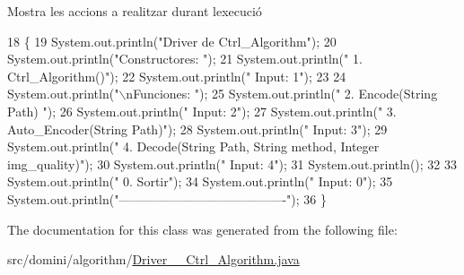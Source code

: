 Mostra les accions a realitzar durant l\textquotesingle{}execució 


\begin{DoxyCode}
18                                      \{
19         System.out.println(\textcolor{stringliteral}{"Driver de Ctrl\_Algorithm"});
20         System.out.println(\textcolor{stringliteral}{"Constructores: "});
21         System.out.println(\textcolor{stringliteral}{"     1. Ctrl\_Algorithm()"});
22         System.out.println(\textcolor{stringliteral}{"     Input: 1"});
23 
24         System.out.println(\textcolor{stringliteral}{"\(\backslash\)nFunciones: "});
25         System.out.println(\textcolor{stringliteral}{"     2. Encode(String Path) "});
26         System.out.println(\textcolor{stringliteral}{"     Input: 2"});
27         System.out.println(\textcolor{stringliteral}{"     3. Auto\_Encoder(String Path)"});
28         System.out.println(\textcolor{stringliteral}{"     Input: 3"});
29         System.out.println(\textcolor{stringliteral}{"     4. Decode(String Path, String method, Integer img\_quality)"});
30         System.out.println(\textcolor{stringliteral}{"     Input: 4"});
31         System.out.println();
32 
33         System.out.println(\textcolor{stringliteral}{"     0. Sortir"});
34         System.out.println(\textcolor{stringliteral}{"     Input: 0"});
35         System.out.println(\textcolor{stringliteral}{"----------------------------------------"});
36     \}
\end{DoxyCode}


The documentation for this class was generated from the following file\+:\begin{DoxyCompactItemize}
\item 
src/domini/algorithm/\hyperlink{Driver____Ctrl__Algorithm_8java}{Driver\+\_\+\+\_\+\+Ctrl\+\_\+\+Algorithm.\+java}\end{DoxyCompactItemize}
